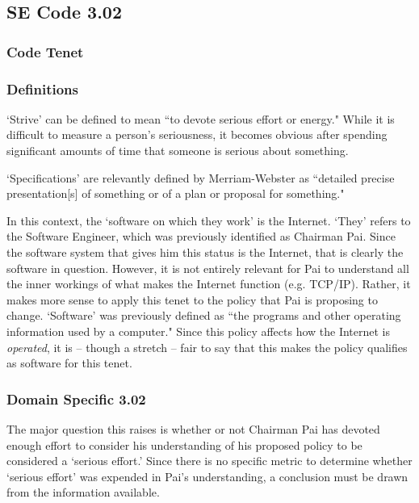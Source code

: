\documentclass[12pt]{article}
\begin{document}
\begin{multicols}{2}
\subsection{SE Code 3.02}
\subsubsection{Code Tenet}
  
  \subsubsection{Definitions}
  `Strive' can be defined to mean ``to devote serious effort or energy."\cite{webster} While it is difficult to measure a person's seriousness, it becomes obvious after spending significant amounts of time that someone is serious about something.
  
  `Specifications' are relevantly defined by Merriam-Webster as ``detailed precise presentation[s] of something or of a plan or proposal for something."\cite{webster} 
  
  In this context, the `software on which they work' is the Internet. `They' refers to the Software Engineer, which was previously identified as Chairman Pai. Since the software system that gives him this status is the Internet, that is clearly the software in question. However, it is not entirely relevant for Pai to understand all the inner workings of what makes the Internet function (e.g. TCP/IP). Rather, it makes more sense to apply this tenet to the policy that Pai is proposing to change. `Software' was previously defined as ``the programs and other operating information used by a computer."\cite{oxford} Since this policy affects how the Internet is \textit{operated}, it is -- though a stretch -- fair to say that this makes the policy qualifies as software for this tenet.
  
  \subsubsection{Domain Specific 3.02}
  
  The major question this raises is whether or not Chairman Pai has devoted enough effort to consider his understanding of his proposed policy to be considered a `serious effort.' Since there is no specific metric to determine whether `serious effort' was expended in Pai's understanding, a conclusion must be drawn from the information available.
  

\end{multicols}
\end{document}
